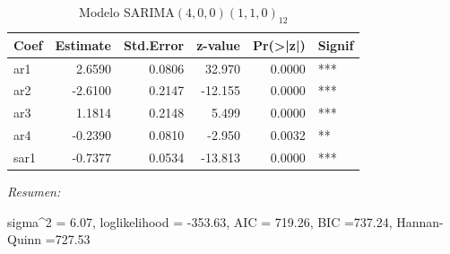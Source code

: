 \documentclass[12pt,oneside]{book}\usepackage[]{graphicx}\usepackage[]{color}
\newenvironment{knitrout}{}{} %
\theoremstyle{definition} %
\begin{document}
\begin{knitrout}
\color{fgcolor}\begin{table}

\caption{\label{tab:unnamed-chunk-18}\label{mod:sarima_resid13}Modelo SARIMA$(4,0,0)(1,1,0)_{12}$}
\centering
\begin{threeparttable}
\begin{tabular}[t]{lrrrrl}
\toprule
Coef & Estimate & Std.Error & z-value & Pr(>|z|) & Signif\\
\midrule
\rowcolor{gray!6}  ar1 & 2.6590 & 0.0806 & 32.970 & 0.0000 & ***\\
ar2 & -2.6100 & 0.2147 & -12.155 & 0.0000 & ***\\
\rowcolor{gray!6}  ar3 & 1.1814 & 0.2148 & 5.499 & 0.0000 & ***\\
ar4 & -0.2390 & 0.0810 & -2.950 & 0.0032 & **\\
\rowcolor{gray!6}  sar1 & -0.7377 & 0.0534 & -13.813 & 0.0000 & ***\\
\bottomrule
\end{tabular}
\begin{tablenotes}
\item \textit{Resumen:} 
\item sigma\textasciicircum{}2 = 6.07, loglikelihood = -353.63, AIC = 719.26, BIC =737.24, Hannan-Quinn =727.53
\end{tablenotes}
\end{threeparttable}
\end{table}


\end{knitrout}
\end{document}
